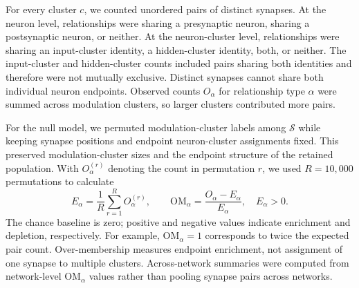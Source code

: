 \documentclass{article}
\begin{document}
For every cluster $c$, we counted unordered pairs of distinct synapses.
At the neuron level, relationships were sharing a presynaptic neuron,
sharing a postsynaptic neuron, or neither. At the neuron-cluster level,
relationships were sharing an input-cluster identity, a hidden-cluster
identity, both, or neither. The input-cluster and hidden-cluster counts
included pairs sharing both identities and therefore were not mutually
exclusive. Distinct synapses cannot share both individual neuron endpoints.
Observed counts $O_\alpha$ for relationship type $\alpha$ were summed across modulation
clusters, so larger clusters contributed more pairs.

For the null model, we permuted modulation-cluster labels among
$\mathcal{S}$ while keeping synapse positions and endpoint neuron-cluster
assignments fixed. This preserved modulation-cluster sizes and the
endpoint structure of the retained population. With $O_\alpha^{(r)}$ denoting
the count in permutation $r$, we used $R=10{,}000$ permutations to calculate
\begin{equation}
    E_\alpha=\frac{1}{R}\sum_{r=1}^{R}O_\alpha^{(r)},
    \qquad
    \mathrm{OM}_\alpha=\frac{O_\alpha-E_\alpha}{E_\alpha},
    \quad E_\alpha>0.
    \label{eq:pair-over-membership}
\end{equation}
The chance baseline is zero; positive and negative values indicate
enrichment and depletion, respectively. For example, $\mathrm{OM}_\alpha=1$
corresponds to twice the expected pair count. Over-membership measures
endpoint enrichment, not assignment of one synapse to multiple clusters.
Across-network summaries were computed from network-level
$\mathrm{OM}_\alpha$ values rather than pooling synapse pairs across networks.
\end{document}
